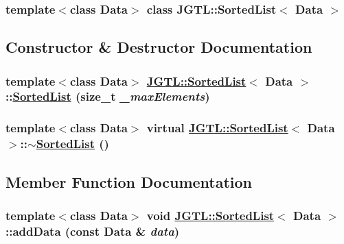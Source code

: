 \subsubsection*{template$<$class Data$>$ class JGTL::Sorted\-List$<$ Data $>$}



\subsection{Constructor \& Destructor Documentation}
\hypertarget{class_j_g_t_l_1_1_sorted_list_1aeb5755a4b248591c707fcb1ff27052}{
\subsubsection[SortedList]{\setlength{\rightskip}{0pt plus 5cm}template$<$class Data$>$ \hyperlink{class_j_g_t_l_1_1_sorted_list}{JGTL::Sorted\-List}$<$ Data $>$::\hyperlink{class_j_g_t_l_1_1_sorted_list}{Sorted\-List} (size\_\-t {\em \_\-max\-Elements})}}
\label{class_j_g_t_l_1_1_sorted_list_1aeb5755a4b248591c707fcb1ff27052}


\hypertarget{class_j_g_t_l_1_1_sorted_list_a8556bcb4bec9a7819f673792c3bc03f}{
\subsubsection[$\sim$SortedList]{\setlength{\rightskip}{0pt plus 5cm}template$<$class Data$>$ virtual \hyperlink{class_j_g_t_l_1_1_sorted_list}{JGTL::Sorted\-List}$<$ Data $>$::$\sim$\hyperlink{class_j_g_t_l_1_1_sorted_list}{Sorted\-List} ()}}
\label{class_j_g_t_l_1_1_sorted_list_a8556bcb4bec9a7819f673792c3bc03f}




\subsection{Member Function Documentation}
\hypertarget{class_j_g_t_l_1_1_sorted_list_374a692e9fc1fe007d2c3d7471731fc1}{
\subsubsection[addData]{\setlength{\rightskip}{0pt plus 5cm}template$<$class Data$>$ void \hyperlink{class_j_g_t_l_1_1_sorted_list}{JGTL::Sorted\-List}$<$ Data $>$::add\-Data (const Data \& {\em data})}}
\label{class_j_g_t_l_1_1_sorted_list_374a692e9fc1fe007d2c3d7471731fc1}


